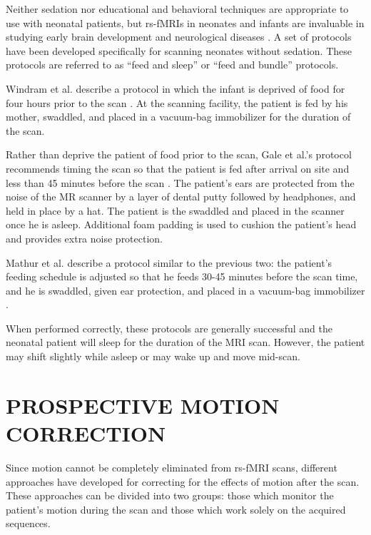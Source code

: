 Neither sedation nor educational and behavioral techniques are appropriate to use with neonatal patients, but rs-fMRIs in neonates and infants are invaluable  in studying early brain development and neurological diseases \cite{Smyser2015}. A set of protocols have been developed specifically for scanning neonates without sedation. These protocols are referred to as ``feed and sleep'' or ``feed and bundle'' protocols.

Windram et al. describe a protocol in which the infant is deprived of food for four hours prior to the scan \cite{Windram2011}. At the scanning facility, the patient is fed by his mother, swaddled, and placed in a vacuum-bag immobilizer for the duration of the scan. 

Rather than deprive the patient of food prior to the scan, Gale et al.'s protocol recommends timing the scan so that the patient is fed after arrival on site and less than 45 minutes before the scan \cite{Gale2013}. The patient's ears are protected from the noise of the MR scanner by a layer of dental putty followed by headphones, and held in place by a hat. The patient is the swaddled and placed in the scanner once he is asleep. Additional foam padding is used to cushion the patient's head and provides extra noise protection.

Mathur et al. describe a protocol similar to the previous two: the patient's feeding schedule is adjusted so that he feeds 30-45 minutes before the scan time, and he is swaddled, given ear protection, and placed in a vacuum-bag immobilizer \cite{Mathur2008}.

When performed correctly, these protocols are generally successful and the neonatal patient will sleep for the duration of the MRI scan. However, the patient may shift slightly while asleep or may wake up and move mid-scan.


\section{PROSPECTIVE MOTION CORRECTION}

Since motion cannot be completely eliminated from rs-fMRI scans, different approaches have developed for correcting for the effects of motion after the scan. These approaches can be divided into two groups: those which monitor the patient's motion during the scan and those which work solely on the acquired sequences.

